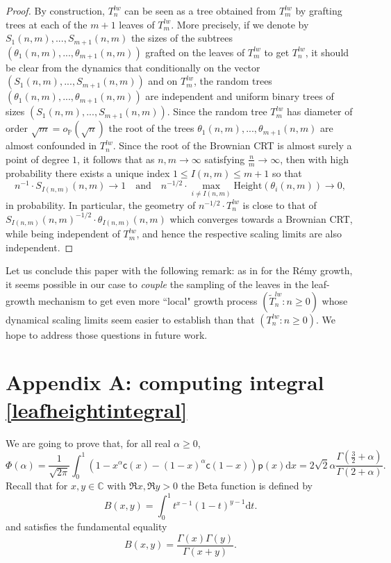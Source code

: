 \documentclass[11pt]{article}
\newcommand{\pp}{\mathsf{p}}
\newcommand{\cc}{\mathsf{c}}
\newcommand{\ff}{\cc}
\renewcommand{\geq}{\geqslant}
\renewcommand{\leq}{\leqslant}
\newcommand{\dd}{\mathrm{d}}
\begin{document}
\begin{proof} By construction, $T^{lw}_n$ can be seen as a tree obtained from  $T^{lw}_m$ by grafting trees at each of the $m+1$ leaves of $T^{lw}_m.$ More precisely, if we denote by $S_1(n,m),... , S_{m+1}(n,m)$ the sizes of the subtrees $( \theta_1(n,m), ... , \theta_{m+1}(n,m))$ grafted on the leaves of $T^{lw}_m$ to get $T^{lw}_n$, it should be clear from the dynamics that conditionally on the vector $(S_1(n,m), ... , S_{m+1}(n,m))$ and on $T^{lw}_m$, the random trees $(\theta_1(n,m), ... , \theta_{m+1}(n,m))$ are independent and uniform binary trees of sizes $(S_1(n,m), ... , S_{m+1}(n,m))$. Since the random tree $T^{lw}_m$ has diameter of order $ \sqrt{m} = o_{\mathbb{P}}(\sqrt{n})$ the root of the trees $\theta_1(n,m), ... , \theta_{m+1}(n,m)$ are almost confounded in $T^{lw}_n$. Since the root of the Brownian CRT is almost surely a point of degree $1$, it follows that as $n,m \to \infty$ satisfying $ \frac{n}{m} \to \infty$, then with high probability there exists a unique index $1 \leq I(n,m) \leq m+1$ so that $$n^{-1} \cdot S_{I(n,m)}(n,m) \to 1 \quad \mbox{and} \quad  n^{-1/2}\cdot \max_{i \ne I(n,m)} \mathrm{Height}(\theta_i(n,m)) \to 0,$$ in probability. In particular, the geometry of $ n^{-1/2}\cdot T^{lw}_n$ is close to that of $ S_{I(n,m)}(n,m)^{-1/2}\cdot \theta_{I(n,m)}(n,m)$ which converges towards a Brownian CRT, while being independent of $T^{lw}_m$, and hence the respective scaling limits are also independent. \end{proof} 


Let us conclude this paper with the following remark: as in \cite{bacher2017efficient} for the Rémy growth, it seems possible in our case to \textit{couple} the sampling of the leaves in the leaf-growth mechanism to get even more ``local" growth process $(\tilde{T}_n^{lw} : n \geq 0)$ whose dynamical scaling limits seem easier to establish than that $({T}_n^{lw} : n \geq 0)$. We hope to address those questions in future work.


\section*{Appendix A: computing integral \eqref{leafheightintegral}}\label{sec: Appendix}
We are going to prove that, for all real $\alpha\geq 0$,
\begin{equation}\label{eq:Phi(alpha)}
\Phi(\alpha) = \frac{1}{\sqrt{2\pi}}\int_{0}^1 \left( 1-x^{\alpha}\ff(x)-(1-x)^{\alpha}\ff(1-x) \right) \pp(x) \dd x=2\sqrt{2}\alpha\frac{\Gamma(\frac{3}{2}+\alpha)}{\Gamma(2+\alpha)}.
\end{equation}
Recall that for $x, y \in \mathbb{C}$ with $\Re x, \Re y > 0$ the Beta function is defined by
\[
B(x,y) = \int_0^1 t^{x-1} (1-t)^{y-1} \dd t.
\]
and satisfies the fundamental equality 
\[
B(x,y) = \frac{\Gamma(x)\Gamma(y)}{\Gamma(x+y)}.
\]
\end{document}

